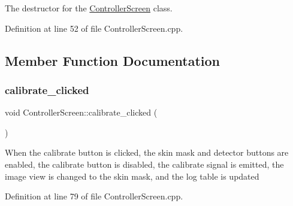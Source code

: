 The destructor for the \hyperlink{class_controller_screen}{Controller\+Screen} class. 

Definition at line 52 of file Controller\+Screen.\+cpp.



\subsection{Member Function Documentation}
\mbox{\label{class_controller_screen_af7f51cf63bb9d2526b0025f35f1e7731}} 
\subsubsection{\texorpdfstring{calibrate\+\_\+clicked}{calibrate\_clicked}}
{\footnotesize\ttfamily void Controller\+Screen\+::calibrate\+\_\+clicked (\begin{DoxyParamCaption}{ }\end{DoxyParamCaption})\hspace{0.3cm}{\ttfamily [slot]}}

When the calibrate button is clicked, the skin mask and detector buttons are enabled, the calibrate button is disabled, the calibrate signal is emitted, the image view is changed to the skin mask, and the log table is updated 

Definition at line 79 of file Controller\+Screen.\+cpp.

